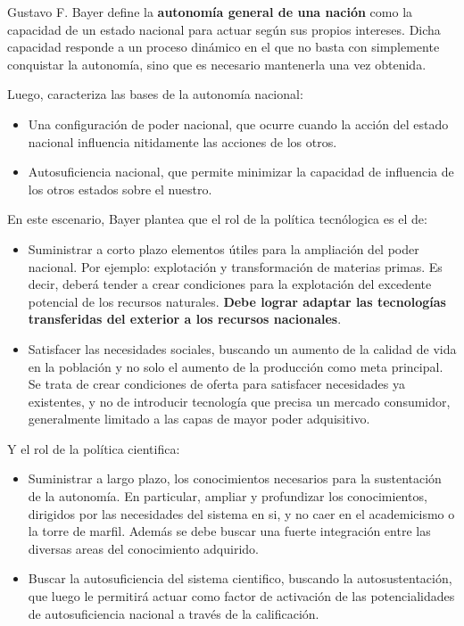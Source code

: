 Gustavo F. Bayer define la \textbf{autonomía general de una nación}  como la capacidad
de un estado nacional para actuar según sus propios intereses. Dicha capacidad
responde a un proceso dinámico en el que no basta con simplemente conquistar la autonomía,
sino que es necesario mantenerla una vez obtenida.

Luego, caracteriza las bases de la autonomía nacional:
\begin{itemize}
    \item Una configuración de poder nacional, que ocurre cuando la acción del estado nacional
        influencia nitidamente las acciones de los otros.
    \item Autosuficiencia nacional, que permite minimizar la capacidad de influencia
        de los otros estados sobre el nuestro.
\end{itemize}

En este escenario, Bayer plantea que el rol de la política tecnólogica es el de:
\begin{itemize}
    \item Suministrar a corto plazo elementos útiles para la ampliación del poder nacional.
        Por ejemplo: explotación y transformación de materias primas. Es decir,
        deberá tender a crear condiciones para la explotación del excedente potencial de los recursos
        naturales. \textbf{Debe lograr adaptar las tecnologías transferidas del exterior a los
        recursos nacionales}.
    \item Satisfacer las necesidades sociales, buscando un aumento de la calidad de vida
        en la población y no solo el aumento de la producción como meta principal.
        Se trata de crear condiciones de oferta para satisfacer necesidades ya existentes,
        y no de introducir tecnología que precisa un mercado consumidor,
        generalmente limitado a las capas de mayor poder adquisitivo.
\end{itemize}

Y el rol de la política cientifica:
\begin{itemize}
    \item Suministrar a largo plazo, los conocimientos necesarios para la sustentación de la autonomía. En particular, ampliar y profundizar los conocimientos, dirigidos por las necesidades del sistema en si, y no caer en el academicismo o la torre de marfil.
        Además se debe buscar una fuerte integración entre las diversas areas del conocimiento adquirido.
    \item Buscar la autosuficiencia del sistema cientifico, buscando la autosustentación, que luego le permitirá actuar como factor de activación de las potencialidades de autosuficiencia nacional a través de la calificación.
\end{itemize}

